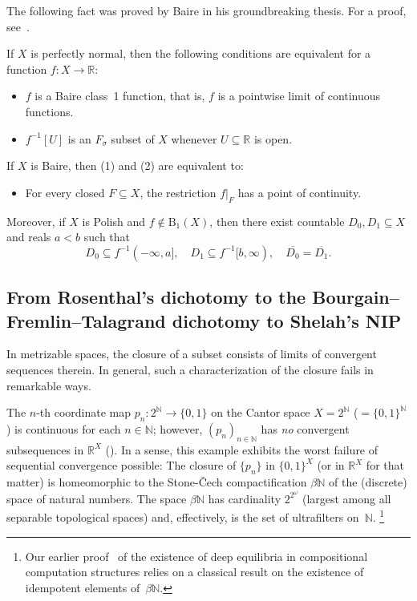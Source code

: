 The following fact was proved by Baire in his groundbreaking thesis.
For a proof, see~\cite[Section 10]{Todorcevic_1997_TopicsTop}.

\begin{fact}[Baire]\label{baire}
    If $X$ is perfectly normal, then the following conditions are equivalent for a function $f\colon X\to \mathbb{R}$:
    \begin{itemize}
        \item[(1)] $f$ is a Baire class~1 function, that is, $f$ is a pointwise limit of continuous functions.
        \item[(2)] $f^{-1}[U]$ is an $F_\sigma$ subset of $X$ whenever $U\subseteq\mathbb{R}$ is open.
    \end{itemize}
    If $X$ is Baire, then (1) and (2) are equivalent to:
    \begin{itemize}
        \item[(3)] For every closed $F\subseteq X$, the restriction $f|_F$ has a point of continuity.
    \end{itemize}
    Moreover, if $X$ is Polish and $f\notin \mathrm{B}_1(X)$, then there exist countable $D_0,D_1\subseteq X$ and reals $a<b$ such that
    \[
    D_0\subseteq f^{-1}(-\infty,a],
    \quad
    D_1\subseteq f^{-1}[b,\infty),
    \quad
    \overline{D_0}=\overline{D_1}.
    \]
\end{fact}

\subsection{From Rosenthal's dichotomy to the Bourgain--Fremlin--Talagrand dichotomy to Shelah's NIP}

In metrizable spaces, the closure of a subset consists of limits of convergent sequences therein.
In general, such a characterization of the closure fails in remarkable ways.

The $n$-th coordinate map $p_n\colon 2^{\mathbb{N}}\to\{0,1\}$ on the Cantor space $X = 2^\mathbb{N}$ ($= \{0, 1\}^{\mathbb{N}}$) is continuous for each $n\in \mathbb{N}$;
however, $(p_n)_{n\in\mathbb{N}}$ has \emph{no} convergent subsequences in $\mathbb{R}^X$ (\cite[Chapter~1.1]{Todorcevic_1997_TopicsTop}).
In a sense, this example exhibits the worst failure of sequential convergence possible:
The closure of $\{p_n\}$ in $\{0, 1\}^X$ (or in $\mathbb{R}^X$ for that matter)
is homeomorphic to the Stone-Čech compactification $\beta\mathbb{N}$ of the (discrete) space of natural numbers.
The space $\beta \mathbb{N}$ has cardinality $2^{2^{\omega}}$ (largest among all separable topological spaces) and, effectively, is the set of ultrafilters on~$\mathbb{N}$.%
\footnote{\label{fn:id-ufilters}Our earlier proof~\cite{alva2024approximability} of the existence of deep equilibria in compositional computation structures relies on a classical result on the existence of idempotent elements of~$\beta \mathbb{N}$.}

